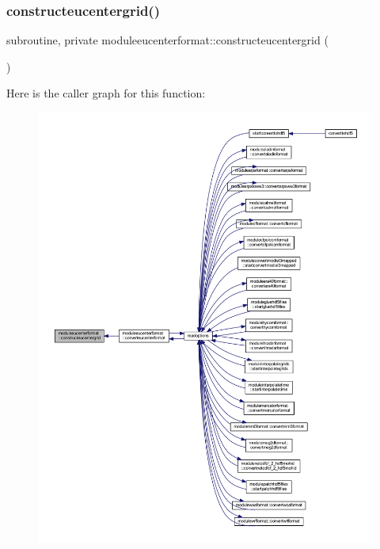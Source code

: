 \subsubsection{\texorpdfstring{constructeucentergrid()}{constructeucentergrid()}}
{\footnotesize\ttfamily subroutine, private moduleeucenterformat\+::constructeucentergrid (\begin{DoxyParamCaption}{ }\end{DoxyParamCaption})\hspace{0.3cm}{\ttfamily [private]}}

Here is the caller graph for this function\+:\nopagebreak
\begin{figure}[H]
\begin{center}
\leavevmode
\includegraphics[width=350pt]{namespacemoduleeucenterformat_a95230a7fb149b9fbacb2fdd6d4bc776d_icgraph}
\end{center}
\end{figure}
\mbox{\label{namespacemoduleeucenterformat_aa12d33b733be8e990e1050000343f7ed}} 
